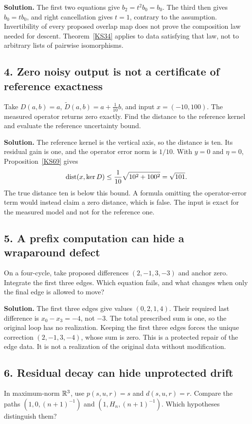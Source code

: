 \textbf{Solution.} The first two equations give \(b_2=t^2b_0=b_0\). The third then gives \(b_0=tb_0\), and right cancellation gives \(t=1\), contrary to the assumption. Invertibility of every proposed overlap map does not prove the composition law needed for descent. Theorem~\ref{KS34} applies to data satisfying that law, not to arbitrary lists of pairwise isomorphisms.

\subsection*{4. Zero noisy output is not a certificate of reference exactness}
Take \(D(a,b)=a\), \(\widetilde D(a,b)=a+\tfrac1{10}b\), and input \(x=(-10,100)\). The measured operator returns zero exactly. Find the distance to the reference kernel and evaluate the reference uncertainty bound.

\textbf{Solution.} The reference kernel is the vertical axis, so the distance is ten. Its residual gain is one, and the operator error norm is \(1/10\). With \(y=0\) and \(\eta=0\), Proposition~\ref{KS69} gives
\[
 \operatorname{dist}(x,\ker D)\le\frac1{10}\sqrt{10^2+100^2}=\sqrt{101}.
\]
The true distance ten is below this bound. A formula omitting the operator-error term would instead claim a zero distance, which is false. The input is exact for the measured model and not for the reference one.

\subsection*{5. A prefix computation can hide a wraparound defect}
On a four-cycle, take proposed differences \((2,-1,3,-3)\) and anchor zero. Integrate the first three edges. Which equation fails, and what changes when only the final edge is allowed to move?

\textbf{Solution.} The first three edges give values \((0,2,1,4)\). Their required last difference is \(x_0-x_3=-4\), not \(-3\). The total prescribed sum is one, so the original loop has no realization. Keeping the first three edges forces the unique correction \((2,-1,3,-4)\), whose sum is zero. This is a protected repair of the edge data. It is not a realization of the original data without modification.

\subsection*{6. Residual decay can hide unprotected drift}
In maximum-norm $\mathbb R^3$, use $p(s,u,r)=s$ and $d(s,u,r)=r$. Compare the paths $(1,0,(n+1)^{-1})$ and $(1,H_n,(n+1)^{-1})$. Which hypotheses distinguish them?

